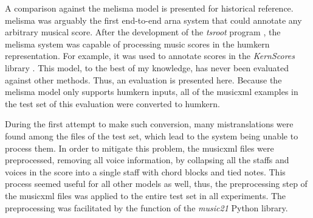 
A comparison against the \gls{melisma} model is presented
for historical reference. \gls{melisma} was arguably the
first end-to-end \gls{arna} system that could annotate any
arbitrary musical score. After the development of the
\emph{tsroot} program \parencite{sapp2009tsroot}, the
\gls{melisma} system was capable of processing music scores
in the \gls{humkern} representation. For example, it was
used to annotate scores in the \emph{KernScores} library
\parencite{sapp2005online}. This model, to the best of my
knowledge, has never been evaluated against other methods.
Thus, an evaluation is presented here. Because the
\gls{melisma} model only supports \gls{humkern} inputs, all
of the \gls{musicxml} examples in the test set of this
evaluation were converted to \gls{humkern}. 

During the first attempt to make such conversion, many
mistranslations were found among the files of the test set,
which lead to the system being unable to process them. In
order to mitigate this problem, the \gls{musicxml} files
were preprocessed, removing all voice information, by
collapsing all the staffs and voices in the score into a
single staff with chord blocks and tied notes. This process
seemed useful for all other models as well, thus, the
preprocessing step of the \gls{musicxml} files was applied
to the entire test set in all experiments. The preprocessing
was facilitated by the  function of the
\emph{music21} Python library.




    

